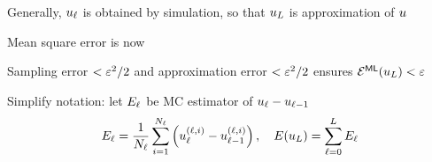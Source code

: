 \begin{frame}{\name{}}
    \begin{overlayarea}{\textwidth}{\frameheight}
        \vspace{2em}%
        \begin{squarelist}
            \item<1-> Generally, $u_\ell$ is obtained by simulation, so that $u_L$ is approximation of $u$
            \item<2-> Mean square error is now
            \item<6-> Sampling error $< \varepsilon^2/2$ and approximation error $< \varepsilon^2/2$ ensures $\mathcal{E}^{\mathsf{ML}}(u_L) < \varepsilon$
            \item<7-> Simplify notation: let $E_\ell$ be MC estimator of $u_\ell - u_{\ell-1}$
                \begin{equation*}
                    E_\ell = \frac{1}{N_\ell}\sum_{i=1}^{N_\ell}\left(u_\ell^{(\ell,i)} - u_{\ell-1}^{(\ell,i)}\right), \quad E(u_L) = \sum_{\ell = 0}^L E_\ell
                \end{equation*}
        \end{squarelist}
    \end{overlayarea}
\end{frame}

